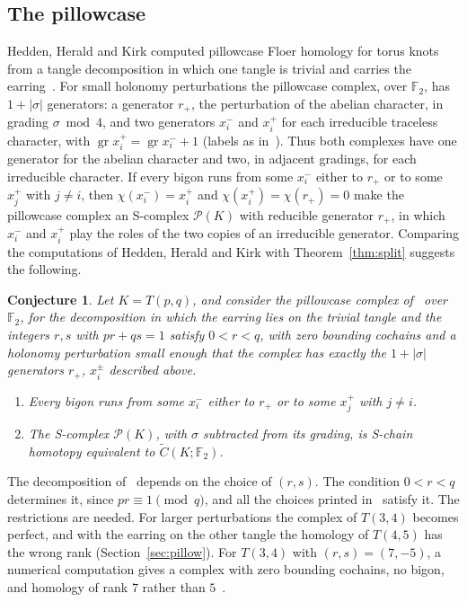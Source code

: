 \documentclass[11pt,reqno]{amsart}
\theoremstyle{plain}
\newtheorem{conjecture}[theorem]{Conjecture}
\theoremstyle{definition}
\newcommand{\tC}{\widetilde C}
\newcommand{\pill}{\mathcal{P}}
\begin{document}
\subsection{The pillowcase}\label{ss:pillowcase}
Hedden, Herald and Kirk computed pillowcase Floer homology for torus knots from a tangle decomposition
in which one tangle is trivial and carries the earring~\cite[\S\S10--11]{HHK2}. For small holonomy
perturbations the pillowcase complex, over $\mathbb F_2$, has $1+|\sigma|$ generators: a generator $r_+$,
the perturbation of the abelian character, in grading $\sigma\bmod4$, and two generators $x_i^-$ and
$x_i^+$ for each irreducible traceless character, with $\operatorname{gr}x_i^+=\operatorname{gr}x_i^-+1$
(labels as in~\cite[\S11]{HHK2}). Thus both complexes have one generator for the abelian character and
two, in adjacent gradings, for each irreducible character. If every bigon runs from some $x_i^-$ either
to $r_+$ or to some $x_j^+$ with $j\neq i$, then $\chi(x_i^-)=x_i^+$ and $\chi(x_i^+)=\chi(r_+)=0$ make the
pillowcase complex an S-complex $\pill(K)$ with reducible generator $r_+$, in which $x_i^-$ and $x_i^+$ play
the roles of the two copies of an irreducible generator. Comparing the computations of Hedden, Herald and
Kirk with Theorem~\ref{thm:split} suggests the following.

\begin{conjecture}\label{conj:pillow}
Let $K=T(p,q)$, and consider the pillowcase complex of~\cite[\S\S10--11]{HHK2} over $\mathbb F_2$, for the
decomposition in which the earring lies on the trivial tangle and the integers $r,s$ with $pr+qs=1$ satisfy
$0<r<q$, with zero bounding cochains and a holonomy perturbation small enough that the complex has exactly
the $1+|\sigma|$ generators $r_+$, $x_i^\pm$ described above.
\begin{enumerate}
\item[(a)] Every bigon runs from some $x_i^-$ either to $r_+$ or to some $x_j^+$ with $j\neq i$.
\item[(b)] The S-complex $\pill(K)$, with $\sigma$ subtracted from its grading, is S-chain homotopy
equivalent to $\tC(K;\mathbb F_2)$.
\end{enumerate}
\end{conjecture}

The decomposition of~\cite[\S10]{HHK2} depends on the choice of $(r,s)$. The condition $0<r<q$ determines it,
since $pr\equiv1\pmod q$, and all the choices printed in~\cite[\S11]{HHK2} satisfy it. The restrictions are needed.
For larger perturbations the complex of $T(3,4)$ becomes perfect, and with the earring on the other tangle
the homology of $T(4,5)$ has the wrong rank (Section~\ref{sec:pillow}). For $T(3,4)$ with $(r,s)=(7,-5)$, a
numerical computation gives a complex with zero bounding cochains, no bigon, and homology of rank $7$ rather
than $5$~\cite{Wpill}.
\end{document}
